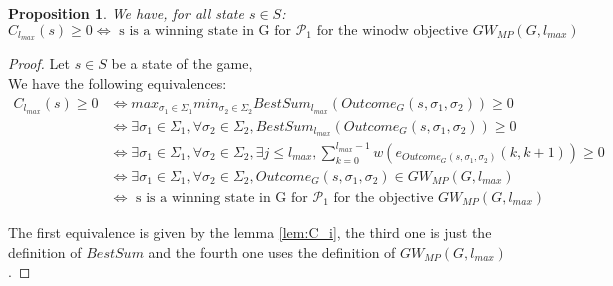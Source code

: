 \documentclass{article}
\theoremstyle{plain}
\newtheorem{prop}[thm]{Proposition}
\begin{document}
\begin{prop}
We have, for all state $s \in S$:
\[C_{l_{max}}(s) \geqslant 0 \iff \text{ s is a winning state in G for $\mathcal{P}_1$ for the winodw objective } GW_{MP}(G, l_{max})\]
\end{prop}

\begin{proof}
Let $s \in S$ be a state of the game,\\
We have the following equivalences:
\begin{align}
C_{l_{max}}(s) \geqslant 0 &\iff max_{\sigma_1 \in \Sigma_1} min_{\sigma_2 \in \Sigma_2} BestSum_{l_{max}}(Outcome_G(s, \sigma_1, \sigma_2)) \geqslant 0\\
						   &\iff \exists \sigma_1 \in \Sigma_1, \forall \sigma_2 \in \Sigma_2, BestSum_{l_{max}}(Outcome_G(s, \sigma_1, \sigma_2)) \geqslant 0\\
						   &\iff \exists \sigma_1 \in \Sigma_1, \forall \sigma_2 \in \Sigma_2, \exists j \leqslant l_{max}, \sum_{k=0}^{l_{max}-1} w(e_{Outcome_G(s, \sigma_1, \sigma_2)} (k, k+1)) \geqslant 0\\
						   &\iff \exists \sigma_1 \in \Sigma_1, \forall \sigma_2 \in \Sigma_2, Outcome_G(s, \sigma_1, \sigma_2) \in GW_{MP}(G, l_{max})\\
						   &\iff \text{ s is a winning state in G for $\mathcal{P}_1$ for the objective } GW_{MP}(G, l_{max})
\end{align}

The first equivalence is given by the lemma \ref{lem:C_i}, the third one is just the definition of $BestSum$ and the fourth one uses the definition of $GW_{MP}(G, l_{max})$.

\end{proof}
\end{document}
